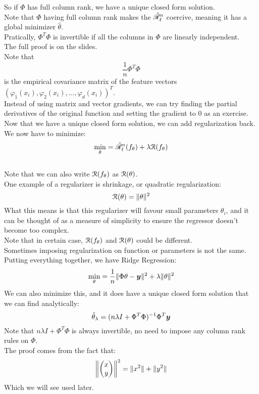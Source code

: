 \documentclass[12pt]{article}
\begin{document}
So if $\Phi$ has full column rank,
we have a unique closed form solution. \\
Note that $\Phi$ having full column rank
makes the $\hat{\mathscr{R}}_{\ell}^{n}$
coercive, meaning it has a global minimizer
$\hat{\theta}$. \\
Pratically, $\Phi^T\Phi$ is invertible
if all the columns in $\Phi$
are linearly independent. \\
The full proof is on the slides. \\

Note that 
\[ \dfrac{1}{n}\Phi^T\Phi \] 
is the empirical covariance matrix of the feature
vectors $(\varphi_1(x_i), \varphi_2(x_i),
\dots, \varphi_d(x_i))^T$. \\

Instead of using matrix and vector gradients,
we can try finding the partial derivatives
of the original function and setting the gradient
to $0$ as an exercise. \\

Now that we have a unique closed form solution,
we can add regularization back. \\

We now have to minimize:
\[ \min_{\theta} = \hat{\mathscr{R}}_{\ell}^{n}(f_\theta)
+ \lambda \mathcal{R}(f_\theta) \] \\
Note that we can also write $\mathcal{R}(f_\theta)$
as $\mathcal{R}(\theta)$. \\

One example of a regularizer is shrinkage,
or quadratic regularization:
\[ \mathcal{R}(\theta) = \|\theta\|^2 \]
What this means is that this regularizer
will favour small parameters $\theta_i$,
and it can be thought of as a measure of
simplicity to ensure the regressor doesn't
become too complex. \\

Note that in certain case, $\mathcal{R}(f_\theta)$
and $\mathcal{R}(\theta)$ could be different. \\
Sometimes imposing regularization on function
or parameters is not the same. \\

Putting everything together, we have Ridge Regression:
\[ \min_{\theta} = \dfrac{1}{n}
\|\Phi \theta - \boldsymbol{y}\|^2 
+ \lambda \|\theta\|^2 \]
We can also minimize this,
and it does have a unique closed form solution that
we can find analytically:
\[ \hat{\theta}_\lambda = 
(n\lambda I + \Phi^T\Phi)^{-1} \Phi^T\boldsymbol{y} \]
Note that $n\lambda I + \Phi^T\Phi$ is always
invertible, no need to impose any column rank
rules on $\Phi$. \\
The proof comes from the fact that:
\[ \left\| \begin{pmatrix} x \\ y \end{pmatrix} \right\|^2 
= \|x^2\| + \|y^2\| \]
Which we will see used later. \\
\end{document}
